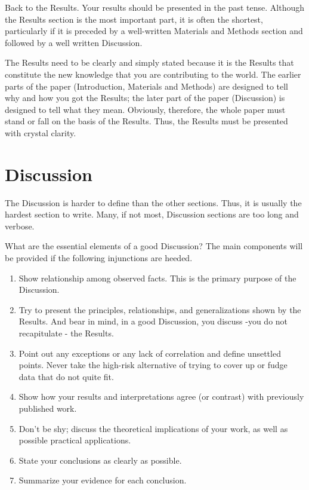 \documentclass[a4paper]{article}
\begin{document}
Back to the Results. Your results should be presented in the past tense.  Although the Results section is the most important part, it is often the shortest, particularly if it is preceded by a well-written Materials and Methods section and followed by a well written Discussion.
 
The Results need to be clearly and simply stated because it is the Results that constitute the new knowledge that you are contributing to the world. The earlier parts of the paper (Introduction, Materials and Methods) are designed to tell why and how you got the Results; the later part of the paper (Discussion) is designed to tell what they mean. Obviously, therefore, the whole paper must stand or fall on the basis of the Results. Thus, the Results must be presented with crystal clarity. 

\section{Discussion}
\label{sec:discussion}
The Discussion is harder to define than the other sections. Thus, it is usually the hardest section to write. Many, if not most, Discussion sections are too long and verbose.
 
What are the essential elements of a good Discussion? The main components will be provided if the following injunctions are heeded.
\begin{enumerate}
	\item	Show relationship among observed facts. This is the primary purpose of the Discussion.
	\item Try to present the principles, relationships, and generalizations shown by the Results. And bear in mind, in a good Discussion, you discuss -you do not recapitulate - the Results.
	\item Point out any exceptions or any lack of correlation and define unsettled points. Never take the high-risk alternative of trying to cover up or fudge data that do not quite fit.
	\item Show how your results and interpretations agree (or contrast) with previously published work.
	\item Don't be shy; discuss the theoretical implications of your work, as well as possible practical applications.
	\item State your conclusions as clearly as possible.
	\item Summarize your evidence for each conclusion.
\end{enumerate} 
\end{document}
